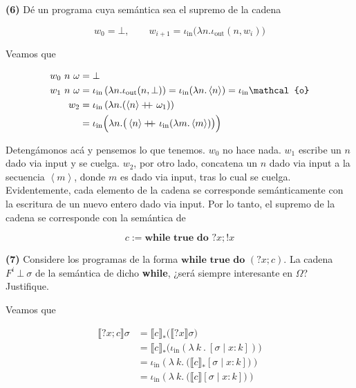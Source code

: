 \documentclass[article, 12pt]{article}
\newcommand\doubleplus{+\kern-1.3ex+\kern0.8ex}
\begin{document}
\pagebreak 

\begin{myframe}
  \textbf{(6)} Dé un programa cuya semántica sea el supremo de la cadena 

  \begin{equation*}
    w_0 = \bot , \qquad w_{i+1} = \iota_{\text{in}} \big( \lambda n.
    \iota_{\text{out}} \left( n, w_i \right)  \big)
  \end{equation*}
\end{myframe}


Veamos que 

\begin{align*}
  w_0 ~ n ~ \omega&= \bot  \\ 
  w_1 ~ n ~ \omega&= \iota_{\text{in}} \left( \lambda n.\iota_\text{out}(n, \bot ) \right) =
  \iota_{\text{in}} (\lambda n . \left<n \right>) = \iota_{\text{in}} \mathcal{o}\\ 
  w_2 &= \iota_{\text{in}}\left( \lambda n. (\left<n \right>  \doubleplus
  \omega_1)\right) \\
      &= \iota_{\text{in}}\Big( \lambda n.\big(\left<n \right>
  \doubleplus \iota_{\text{in}}(\lambda m . \left<m \right>)\big) \Big) 
\end{align*}

Detengámonos acá y pensemos lo que tenemos. $w_0$ no hace nada. $w_1$ escribe un
$n$ dado via input y se cuelga. $w_2$, por otro lado, concatena un $n$ dado via
input a la secuencia $\left< m \right>$, donde $m$ es dado via input, tras lo
cual se cuelga. Evidentemente, cada elemento de la cadena se corresponde
semánticamente con la escritura de un nuevo entero dado via input. Por lo tanto,
el supremo de la cadena se corresponde con la semántica de 

\begin{equation*}
  c := \textbf{while } \textbf{true} \textbf{ do } ?x;!x
\end{equation*}

\pagebreak 

\begin{myframe}
  \textbf{(7)} Considere los programas de la forma $\textbf{while true do } (?x;c)$. La
  cadena $F^i ~ \bot ~\sigma$ de la semántica de dicho \textbf{while}, ¿será
  siempre interesante en $\Omega$? Justifique.
\end{myframe}

Veamos que 

\begin{align*}
  \llbracket ?x;c \rrbracket \sigma
  &= \llbracket c \rrbracket_* \big( \llbracket ?x \rrbracket\sigma \big) \\ 
  &= \llbracket c \rrbracket_* \big( \iota_{\text{in}}\left( \lambda
  ~k~.~[\sigma \mid x : k] \right)  \big) \\ 
  &= \iota_{\text{in}} \left( \lambda ~ k . ~ \big( \llbracket c
  \rrbracket_*[\sigma \mid x : k] \big) \right) \\
  &= \iota_{\text{in}} \left( \lambda ~ k . ~ \big( \llbracket c
  \rrbracket[\sigma \mid x : k] \big) \right) 
\end{align*}
\end{document}
